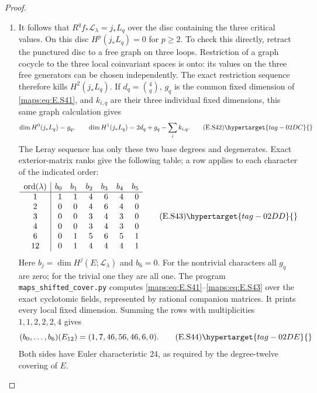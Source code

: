\begin{proof}
\begin{enumerate}[label={$\langle1\rangle$\arabic*.},leftmargin=*]
\item It follows that $R^q f_*\mathcal L_\lambda=j_*L_q$ over
the disc containing the three critical values. On this
disc $H^p(j_*L_q)=0$ for $p\geq2$. To check this directly,
retract the punctured disc to a free graph on three loops.
Restriction of a graph cocycle to the three local
coinvariant spaces is onto: its values on the three free
generators can be chosen independently. The exact
restriction sequence therefore kills $H^2(j_*L_q)$.
If $d_q=\binom4q$, $g_q$ is the common fixed dimension of
\eqref{maps:eq:E.S41}, and $k_{i,q}$ are their three individual fixed
dimensions, this same graph calculation gives
\[
 \dim H^0(j_*L_q)=g_q,\qquad
 \dim H^1(j_*L_q)=2d_q+g_q-\sum_i k_{i,q}.
 \tag{E.S42}\hypertarget{tag-02DC}{}\label{maps:eq:E.S42}
\]
The Leray sequence has only these two base degrees and
degenerates. Exact exterior-matrix ranks give the following
table; a row applies to each character of the indicated
order:
\[
 \begin{array}{c|rrrrrr}
 \operatorname{ord}(\lambda)&b_0&b_1&b_2&b_3&b_4&b_5\\ \hline
 1 &1&1&4&6&4&0\\
 2 &0&0&4&6&4&0\\
 3 &0&0&3&4&3&0\\
 4 &0&0&3&4&3&0\\
 6 &0&1&5&6&5&1\\
 12&0&1&4&4&4&1
 \end{array}
 \tag{E.S43}\hypertarget{tag-02DD}{}\label{maps:eq:E.S43}
\]
Here $b_j=\dim H^j(E;\mathcal L_\lambda)$ and $b_6=0$.
For the nontrivial characters all $g_q$ are zero; for the
trivial one they are all one. The program
\texttt{maps\_shifted\_cover.py} computes \eqref{maps:eq:E.S41}--\eqref{maps:eq:E.S43}
over the exact cyclotomic fields, represented by rational
companion matrices. It prints every local fixed dimension.
Summing the rows with multiplicities $1,1,2,2,2,4$ gives
\[
             (b_0,\ldots,b_6)(E_{12})=(1,7,46,56,46,6,0).
 \tag{E.S44}\hypertarget{tag-02DE}{}\label{maps:eq:E.S44}
\]
Both sides have Euler characteristic $24$, as required by
the degree-twelve covering of $E$.


\end{enumerate}
\end{proof}
